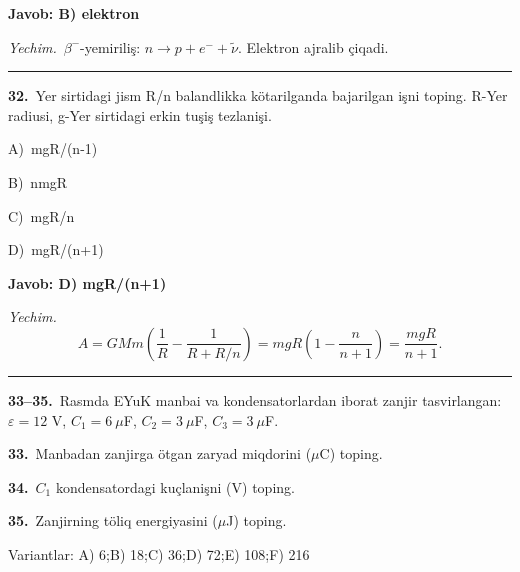 \documentclass[11pt,a4paper]{article}
\newcommand{\opt}[2]{\hspace*{4mm}#1)\ #2\par}
\begin{document}
\noindent\colorbox{gray!12}{\parbox{\dimexpr\linewidth-2\fboxsep}{\textbf{Javob: B) elektron}}}\par\smallskip
\noindent\textit{Yechim.}\ $\beta^-$-yemiriliş: $n\to p+e^-+\tilde\nu$. Elektron ajralib çiqadi.\par\par\medskip\hrule\medskip
{}\noindent\begin{minipage}{\linewidth}
\textbf{32.}\ Yer sirtidagi jism R/n balandlikka kötarilganda bajarilgan işni toping. R-Yer radiusi, g-Yer sirtidagi erkin tuşiş tezlanişi.\par\smallskip
\opt{A}{mgR/(n-1)}
\opt{B}{nmgR}
\opt{C}{mgR/n}
\opt{D}{mgR/(n+1)}
\end{minipage}\vspace{2pt}\par
\noindent\colorbox{gray!12}{\parbox{\dimexpr\linewidth-2\fboxsep}{\textbf{Javob: D) mgR/(n+1)}}}\par\smallskip
\noindent\textit{Yechim.}\ \[A=GMm\left(\frac1R-\frac{1}{R+R/n}\right)=mgR\left(1-\frac{n}{n+1}\right)=\frac{mgR}{n+1}.\]\par\medskip\hrule\medskip
\newpage\noindent\textbf{33–35.}\ Rasmda EYuK manbai va kondensatorlardan iborat zanjir tasvirlangan: $\varepsilon=12$ V, $C_1=6\ \mu$F, $C_2=3\ \mu$F, $C_3=3\ \mu$F.\par\medskip
\begin{center}\end{center}
\noindent\textbf{33.}\ Manbadan zanjirga ötgan zaryad miqdorini ($\mu$C) toping.\par
\noindent\textbf{34.}\ $C_1$ kondensatordagi kuçlanişni (V) toping.\par
\noindent\textbf{35.}\ Zanjirning töliq energiyasini ($\mu$J) toping.\par
\noindent Variantlar: A) 6;\quad B) 18;\quad C) 36;\quad D) 72;\quad E) 108;\quad F) 216\par\smallskip
\end{document}
